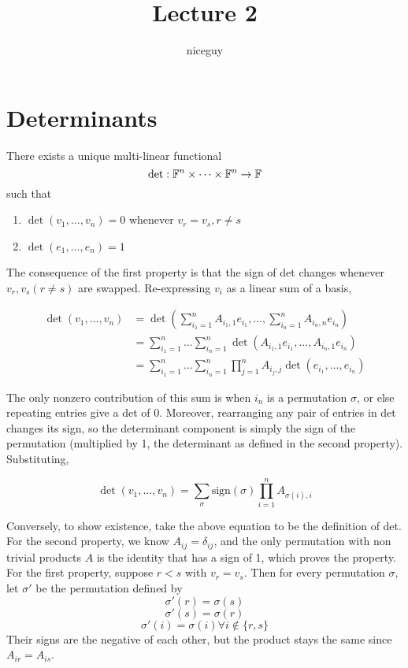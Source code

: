 \documentclass[12pt]{article}
\author{niceguy}
\title{Lecture 2}
\begin{document}
\maketitle

\section{Determinants}

\begin{thm}
	There exists a unique multi-linear functional
	$$\det: \mathbb{F}^n \times \dots \times \mathbb{F}^n \rightarrow \mathbb{F}$$
	such that
	\begin{enumerate}
		\item $\det(v_1, \dots, v_n) = 0$ whenever $v_r = v_s, r\neq s$
		\item $\det(e_1, \dots, e_n) = 1$
	\end{enumerate}
\end{thm}

The consequence of the first property is that the sign of det changes whenever $v_r, v_s (r\neq s)$ are swapped. Re-expressing $v_i$ as a linear sum of a basis,

\begin{align*}
	\det(v_1,\dots,v_n) &= \det\left(\sum_{i_1=1}^nA_{i_1,1}e_{i_1},\dots,\sum_{i_n=1}^nA_{i_n,n}e_{i_n}\right) \\
			    &= \sum_{i_1=1}^n\dots\sum_{i_n=1}^n\det(A_{i_1,1}e_{i_1},\dots,A_{i_n,1}e_{i_n}) \\
			    &= \sum_{i_1=1}^n\dots\sum_{i_n=1}^n \prod_{j=1}^nA_{i_j,j}\det(e_{i_1},\dots,e_{i_n})
\end{align*}

The only nonzero contribution of this sum is when $i_n$ is a permutation $\sigma$, or else repeating entries give a det of 0. Moreover, rearranging any pair of entries in det changes its sign, so the determinant component is simply the sign of the permutation (multiplied by 1, the determinant as defined in the second property). Substituting,

$$\det(v_1,\dots,v_n) = \sum_\sigma \text{sign}(\sigma) \prod_{i=1}^n A_{\sigma(i),i}$$
	
	Conversely, to show existence, take the above equation to be the definition of det. \\
For the second property, we know $A_{ij} = \delta_{ij}$, and the only permutation with non trivial products $A$ is the identity that has a sign of 1, which proves the property. \\
For the first property, suppose $r<s$ with $v_r=v_s$. Then for every permutation $\sigma$, let $\sigma'$ be the permutation defined by
$$\sigma'(r) = \sigma(s)$$
$$\sigma'(s) = \sigma(r)$$
$$\sigma'(i) = \sigma(i) \forall i\notin\{r,s\}$$
Their signs are the negative of each other, but the product stays the same since $A_{ir} = A_{is}$.
\end{document}
